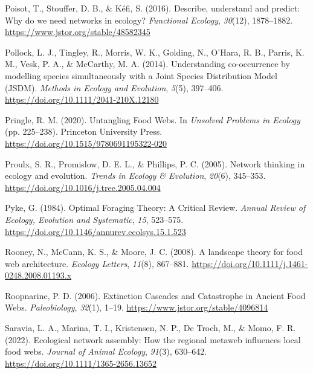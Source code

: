 \documentclass[
]{article}
\newlength{\cslhangindent}
\newenvironment{CSLReferences}[2] %
 {\begin{list}{}{%
  \setlength{\itemindent}{0pt}
  \setlength{\leftmargin}{0pt}
  \setlength{\parsep}{0pt}
  \ifodd #1
   \setlength{\leftmargin}{\cslhangindent}
   \setlength{\itemindent}{-1\cslhangindent}
  \fi
  \setlength{\itemsep}{#2\baselineskip}}}
 {\end{list}}
\begin{document}
\begin{CSLReferences}{1}{0}
Poisot, T., Stouffer, D. B., \& Kéfi, S. (2016). Describe, understand
and predict: Why do we need networks in ecology? \emph{Functional
Ecology}, \emph{30}(12), 1878--1882.
\url{https://www.jstor.org/stable/48582345}

Pollock, L. J., Tingley, R., Morris, W. K., Golding, N., O'Hara, R. B.,
Parris, K. M., Vesk, P. A., \& McCarthy, M. A. (2014). Understanding
co-occurrence by modelling species simultaneously with a {Joint Species
Distribution Model} ({JSDM}). \emph{Methods in Ecology and Evolution},
\emph{5}(5), 397--406. \url{https://doi.org/10.1111/2041-210X.12180}

Pringle, R. M. (2020). Untangling {Food Webs}. In \emph{Unsolved
{Problems} in {Ecology}} (pp. 225--238). Princeton University Press.
\url{https://doi.org/10.1515/9780691195322-020}

Proulx, S. R., Promislow, D. E. L., \& Phillips, P. C. (2005). Network
thinking in ecology and evolution. \emph{Trends in Ecology \&
Evolution}, \emph{20}(6), 345--353.
\url{https://doi.org/10.1016/j.tree.2005.04.004}

Pyke, G. (1984). Optimal {Foraging Theory}: {A Critical Review}.
\emph{Annual Review of Ecology, Evolution and Systematic}, \emph{15},
523--575. \url{https://doi.org/10.1146/annurev.ecolsys.15.1.523}

Rooney, N., McCann, K. S., \& Moore, J. C. (2008). A landscape theory
for food web architecture. \emph{Ecology Letters}, \emph{11}(8),
867--881. \url{https://doi.org/10.1111/j.1461-0248.2008.01193.x}

Roopnarine, P. D. (2006). Extinction {Cascades} and {Catastrophe} in
{Ancient Food Webs}. \emph{Paleobiology}, \emph{32}(1), 1--19.
\url{https://www.jstor.org/stable/4096814}

Saravia, L. A., Marina, T. I., Kristensen, N. P., De Troch, M., \& Momo,
F. R. (2022). Ecological network assembly: {How} the regional metaweb
influences local food webs. \emph{Journal of Animal Ecology},
\emph{91}(3), 630--642. \url{https://doi.org/10.1111/1365-2656.13652}


\end{CSLReferences}
\end{document}

